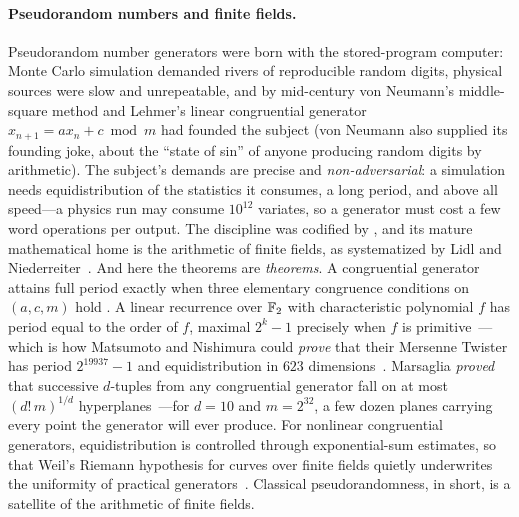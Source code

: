 \paragraph{Pseudorandom numbers and finite fields.}
Pseudorandom number generators were born with the stored-program
computer: Monte Carlo simulation demanded rivers of reproducible random
digits, physical sources were slow and unrepeatable, and by mid-century
von Neumann's middle-square method and Lehmer's linear congruential
generator $x_{n+1} = a x_n + c \bmod m$ had founded the subject (von
Neumann also supplied its founding joke, about the ``state of sin'' of
anyone producing random digits by arithmetic). The subject's demands
are precise and \emph{non-adversarial}: a simulation needs
equidistribution of the statistics it consumes, a long period, and
above all speed---a physics run may consume $10^{12}$ variates, so a
generator must cost a few word operations per output. The discipline
was codified by \citet[Ch.~3]{Knuth1997}, and its mature mathematical
home is the arithmetic of finite fields, as systematized by Lidl and
Niederreiter~\citep{LidlNiederreiter1997, Niederreiter1992}. And here
the theorems are \emph{theorems}. A congruential generator attains full
period exactly when three elementary congruence conditions on
$(a, c, m)$ hold \citep[the Hull--Dobell criterion;][\S 3.2.1]{Knuth1997}.
A linear recurrence over $\mathbb{F}_2$ with characteristic polynomial $f$ has
period equal to the order of $f$, maximal $2^k - 1$ precisely when $f$
is primitive~\citep[Ch.~8]{LidlNiederreiter1997}---which is how
Matsumoto and Nishimura could \emph{prove} that their Mersenne Twister
has period $2^{19937}-1$ and equidistribution in $623$
dimensions~\citep{MatsumotoNishimura1998}. Marsaglia \emph{proved} that
successive $d$-tuples from any congruential generator fall on at most
$(d!\,m)^{1/d}$ hyperplanes~\citep{Marsaglia1968}---for $d = 10$ and
$m = 2^{32}$, a few dozen planes carrying every point the generator
will ever produce. For nonlinear congruential generators,
equidistribution is controlled through exponential-sum estimates, so
that Weil's Riemann hypothesis for curves over finite fields quietly
underwrites the uniformity of practical
generators~\citep{Niederreiter1992}. Classical pseudorandomness, in
short, is a satellite of the arithmetic of finite fields.

